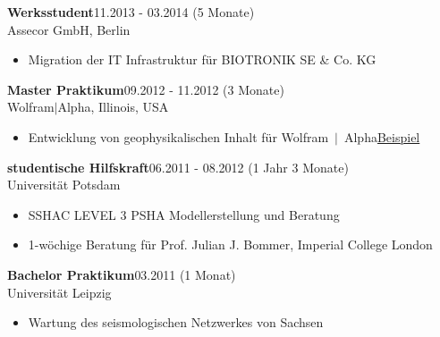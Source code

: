 \documentclass{article}
\newcommand{\spacingWork}{0.25cm}
\begin{document}
\begin{minipage}{0.71\textwidth}
	\vspace{\spacingWork}
	
		\textbf{Werksstudent}\hfill 11.2013 - 03.2014 (5 Monate)\\ Assecor GmbH, Berlin
		\begin{itemize}
			\item Migration der IT Infrastruktur für BIOTRONIK SE \& Co. KG
		\end{itemize}
		
	\vspace{\spacingWork}
	
		\textbf{Master Praktikum}\hfill 09.2012 - 11.2012 (3 Monate)\\ Wolfram$\mid$Alpha, Illinois, USA
		\begin{itemize}
			\item Entwicklung von geophysikalischen Inhalt für Wolfram$~\mid~$Alpha\hfill \href{https://www.wolframalpha.com/input/?i=moment+magnitude}{\color{pblue}Beispiel}
		\end{itemize}
		
	\vspace{\spacingWork}
	
		\textbf{studentische Hilfskraft}\hfill 06.2011 - 08.2012 (1 Jahr 3 Monate)\\Universität Potsdam
		\begin{itemize}
			\item SSHAC LEVEL 3 PSHA Modellerstellung und Beratung
			\item 1-wöchige Beratung für Prof. Julian J. Bommer, Imperial College London
		\end{itemize}


	\vspace{\spacingWork}

		\textbf{Bachelor Praktikum}\hfill 03.2011 (1 Monat)\\ Universität Leipzig
		\begin{itemize}
			\item Wartung des seismologischen Netzwerkes von Sachsen
		\end{itemize}
\end{minipage}
\end{document}
